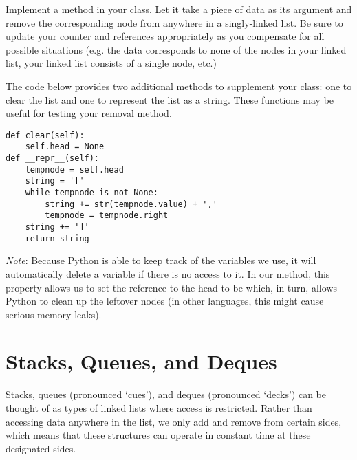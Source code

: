 \begin{problem}
Implement a  method in your  class.
Let it take a piece of data as its argument and remove the corresponding node from anywhere in a singly-linked list.
Be sure to update your counter and references appropriately as you compensate for all possible situations (e.g. the data corresponds to none of the nodes in your linked list, your linked list consists of a single node, etc.)

The code below provides two additional methods to supplement your  class: one to clear the list and one to represent the list as a string.
These functions may be useful for testing your removal method.
\begin{lstlisting}
def clear(self):
    self.head = None
def __repr__(self):
    tempnode = self.head
    string = '['
    while tempnode is not None:
        string += str(tempnode.value) + ','
        tempnode = tempnode.right
    string += ']'
    return string
\end{lstlisting}
\label{prob:LinkedLists}
\emph{Note}: Because Python is able to keep track of the variables we use, it will automatically delete a variable if there is no access to it.
In our  method, this property allows us to set the reference to the head to be  which, in turn, allows Python to clean up the leftover nodes (in other languages, this might cause serious memory leaks).

\end{problem}

\section*{Stacks, Queues, and Deques}
Stacks, queues (pronounced `cues'), and deques (pronounced `decks') can be thought of as types of linked lists where access is restricted.
Rather than accessing data anywhere in the list, we only add and remove from certain sides, which means that these structures can operate in constant time at these designated sides.
\begin{comment}
Rather than searching for a certain piece of data to remove, in stacks, deques, and queues we keep track of the order the data was added in and simply ask for what is on the end.
\end{comment}

